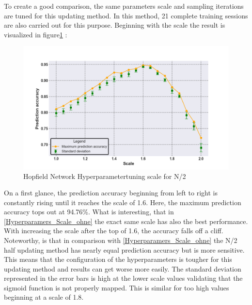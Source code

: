 To create a good comparison, the same parameters scale and sampling iterations are tuned for this updating method. 
In this method, 21 complete training sessions are also carried out for this purpose.
Beginning with the scale the result is visualized in figure\ref{Hyperparamers_Scale_mit} :
\begin{figure}[H]
    \centering
    \includegraphics[width=0.9\linewidth]{graphics/NEW_Scale_MIT_N2_Half_Pred_Acc.png}
    \caption{Hopfield Network Hyperparametertuning scale for N/2}
    \label{Hyperparamers_Scale_mit}
\end{figure}
On a first glance, the prediction accuracy beginning from left to right is constantly rising until it reaches the scale of 1.6.
Here, the maximum prediction accuracy tops out at 94.76\%.
What is interesting, that in \ref{Hyperparamers_Scale_ohne} the exact same scale has also the best performance. 
With increasing the scale after the top of 1.6, the accuracy falls off a cliff. 
Noteworthy, is that in comparison with \ref{Hyperparamers_Scale_ohne} the N/2 half updating method has nearly equal prediction accuracy
but is more sensitive. 
This means that the configuration of the hyperparameters is tougher for this updating method and results can get worse more easily. 
The standard deviation represented in the error bars is high at the lower scale values validating that the sigmoid function is not properly mapped. 
This is similar for too high values beginning at a scale of 1.8.

